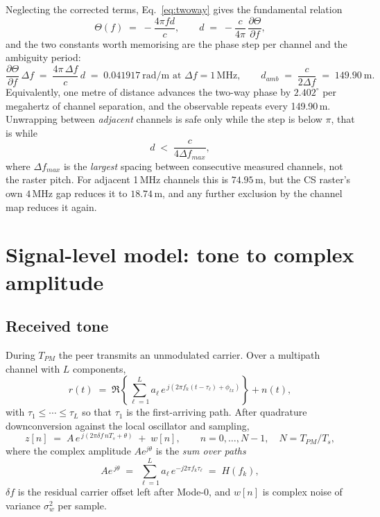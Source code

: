 \documentclass[11pt,a4paper]{article}
\newcommand{\Tpm}{T_{PM}}
\begin{document}
Neglecting the corrected terms, Eq.~\eqref{eq:twoway} gives the fundamental relation
\begin{equation}
\Theta(f) \;=\; -\frac{4\pi f d}{c},
\qquad
d \;=\; -\frac{c}{4\pi}\,\frac{\partial \Theta}{\partial f} ,
\label{eq:dfromslope}
\end{equation}
and the two constants worth memorising are the phase step per channel and the ambiguity period:
\begin{equation}
\frac{\partial\Theta}{\partial f}\,\Delta f
  \;=\; \frac{4\pi\,\Delta f}{c}\,d
  \;=\; 0.041917\ \text{rad/m at }\Delta f = 1\,\text{MHz},
\qquad
d_{amb} \;=\; \frac{c}{2\Delta f} \;=\; 149.90\ \text{m}.
\label{eq:consts}
\end{equation}
Equivalently, one metre of distance advances the two-way phase by $2.402^{\circ}$ per megahertz of
channel separation, and the observable repeats every 149.90\,m. Unwrapping between \emph{adjacent}
channels is safe only while the step is below $\pi$, that is while
\begin{equation}
d \;<\; \frac{c}{4\Delta f_{max}} ,
\label{eq:unwraplimit}
\end{equation}
where $\Delta f_{max}$ is the \emph{largest} spacing between consecutive measured channels, not the
raster pitch. For adjacent 1\,MHz channels this is $74.95$\,m, but the CS raster's own $4$\,MHz gap
reduces it to $18.74$\,m, and any further exclusion by the channel
map reduces it again.

\section{Signal-level model: tone to complex amplitude}
\label{sec:signal}

\subsection{Received tone}

During $\Tpm$ the peer transmits an unmodulated carrier. Over a multipath channel with $L$
components,
\begin{equation}
r(t) \;=\; \Re\left\{ \sum_{\ell=1}^{L} a_\ell\,
   e^{\,j\left(2\pi f_k (t-\tau_\ell) + \phi_{tx}\right)} \right\} + n(t),
\label{eq:rxtone}
\end{equation}
with $\tau_1 \le \cdots \le \tau_L$ so that $\tau_1$ is the first-arriving path. After quadrature
downconversion against the local oscillator and sampling,
\begin{equation}
z[n] \;=\; A\,e^{\,j(2\pi \delta f\, n T_s + \theta)} \;+\; w[n],
\qquad n = 0,\dots,N-1,\quad N = \Tpm/T_s,
\label{eq:zn}
\end{equation}
where the complex amplitude $A e^{j\theta}$ is the \emph{sum over paths}
\begin{equation}
A e^{\,j\theta} \;=\; \sum_{\ell=1}^{L} a_\ell\, e^{-j 2\pi f_k \tau_\ell} \;=\; H(f_k),
\label{eq:Hfk}
\end{equation}
$\delta f$ is the residual carrier offset left after Mode-0, and $w[n]$ is complex noise of variance
$\sigma_w^2$ per sample.
\end{document}
